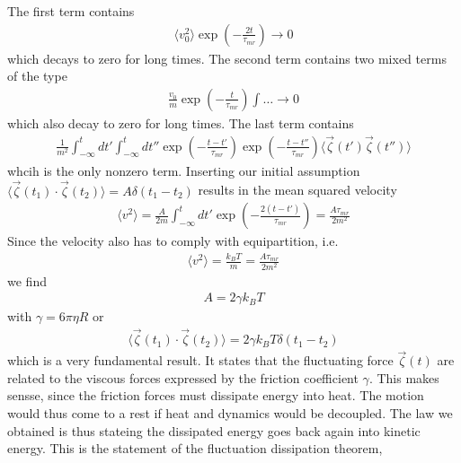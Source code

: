 \documentclass[letterpaper,10pt,english]{sphinxmanual}
\begin{document}
\sphinxAtStartPar
The first term contains
\begin{equation*}
\begin{split}\langle v_0^2 \rangle \exp\left (-\frac{2t}{\tau_{mr}} \right )\rightarrow 0\end{split}
\end{equation*}
\sphinxAtStartPar
which decays to zero for long times. The second term contains two mixed terms of the type
\begin{equation*}
\begin{split}\frac{v_0}{m}\exp\left (-\frac{t}{\tau_{mr}} \right ) \int \ldots \rightarrow 0\end{split}
\end{equation*}
\sphinxAtStartPar
which also decay to zero for long times. The last term contains
\begin{equation*}
\begin{split}\frac{1}{m^2}\int_{-\infty}^{t}dt' \int_{-\infty}^{t}dt''\exp\left ( -\frac{t-t'}{\tau_{mr}} \right )\exp\left ( -\frac{t-t''}{\tau_{mr}} \right )\langle \vec{\zeta}(t')\vec{\zeta}(t'')\rangle\end{split}
\end{equation*}
\sphinxAtStartPar
whcih is the only nonzero term. Inserting our initial assumption \(\langle\vec{\zeta}(t_1)\cdot \vec{\zeta}(t_2) \rangle =A\delta (t_1-t_2)\) results in the mean squared velocity
\begin{equation*}
\begin{split}\langle v^2\rangle =\frac{A}{2m}\int_{-\infty}^{t}dt' \exp\left ( -\frac{2(t-t')}{\tau_{mr}}\right)=\frac{A\tau_{mr}}{2m^2}\end{split}
\end{equation*}
\sphinxAtStartPar
Since the velocity also has to comply with equipartition, i.e.
\begin{equation*}
\begin{split}\langle v^2\rangle=\frac{k_B T}{m}=\frac{A\tau_{mr}}{2m^2}\end{split}
\end{equation*}
\sphinxAtStartPar
we find
\begin{equation*}
\begin{split}A=2\gamma k_B T\end{split}
\end{equation*}
\sphinxAtStartPar
with \(\gamma=6\pi\eta R\) or
\begin{equation*}
\begin{split}\langle\vec{\zeta}(t_1)\cdot \vec{\zeta}(t_2) \rangle =2\gamma k_B T\delta (t_1-t_2)\end{split}
\end{equation*}
\sphinxAtStartPar
which is a very fundamental result. It states that the fluctuating force \(\vec{\zeta}(t)\) are related to the viscous forces expressed by the friction coefficient \(\gamma\). This makes sensse, since the friction forces must dissipate energy into heat. The motion would thus come to a rest if heat and dynamics would be decoupled. The law we obtained is thus stateing the dissipated energy goes back again into kinetic energy. This is the statement of the fluctuation dissipation theorem,
\end{document}
